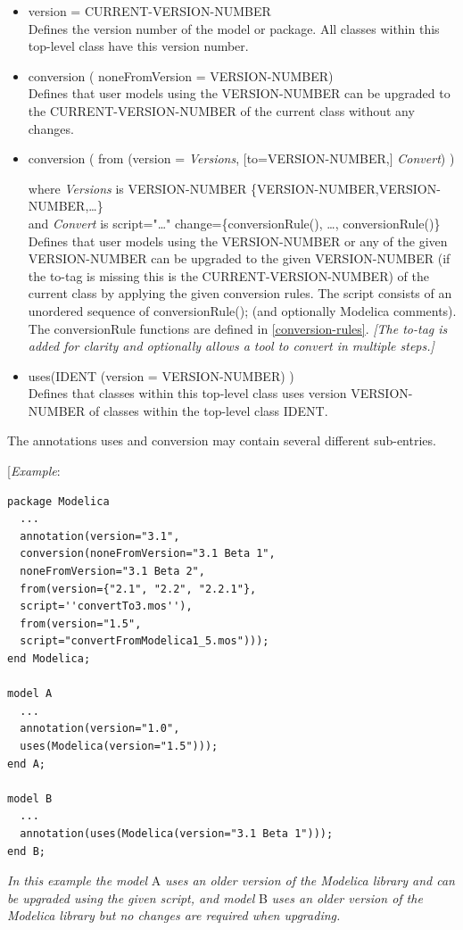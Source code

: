 \documentclass[10pt,a4paper]{report}
\begin{document}
\begin{itemize}
\item
  version = CURRENT-VERSION-NUMBER\\
  Defines the version number of the model or package. All classes within
  this top-level class have this version number.
\item
  conversion ( noneFromVersion = VERSION-NUMBER)\\
  Defines that user models using the VERSION-NUMBER can be upgraded to
  the CURRENT-VERSION-NUMBER of the current class without any changes.
\item
  conversion ( from (version = \emph{Versions}, {[}to=VERSION-NUMBER,{]}
  \emph{Convert}) )

  where \emph{Versions} is VERSION-NUMBER \textbar{}
  \{VERSION-NUMBER,VERSION-NUMBER,\ldots{}\}\\
  and \emph{Convert} is script="\ldots{}" \textbar{}
  change=\{conversionRule(), \ldots{}, conversionRule()\}\\
  Defines that user models using the VERSION-NUMBER or any of the given
  VERSION-NUMBER can be upgraded to the given VERSION-NUMBER (if the
  to-tag is missing this is the CURRENT-VERSION-NUMBER) of the current
  class by applying the given conversion rules. The script consists of
  an unordered sequence of conversionRule(); (and optionally Modelica
  comments). The conversionRule functions are defined in \ref{conversion-rules}.
  \emph{{[}The to-tag is added for clarity and optionally allows a tool
  to convert in multiple steps.{]}}
\item
  uses(IDENT (version = VERSION-NUMBER) )\\
  Defines that classes within this top-level class uses version
  VERSION-NUMBER of classes within the top-level class IDENT.
\end{itemize}

The annotations uses and conversion may contain several different
sub-entries.

{[}\emph{Example}:

\begin{lstlisting}[language=modelica]
package Modelica
  ...
  annotation(version="3.1",
  conversion(noneFromVersion="3.1 Beta 1",
  noneFromVersion="3.1 Beta 2",
  from(version={"2.1", "2.2", "2.2.1"},
  script=''convertTo3.mos''),
  from(version="1.5",
  script="convertFromModelica1_5.mos")));
end Modelica;

model A
  ...
  annotation(version="1.0",
  uses(Modelica(version="1.5")));
end A;

model B
  ...
  annotation(uses(Modelica(version="3.1 Beta 1")));
end B;
\end{lstlisting}
\emph{In this example the model} A \emph{uses an older version of the
Modelica library and can be upgraded using the given script, and model}
B \emph{uses an older version of the Modelica library but no changes are
required when upgrading. }
\end{document}
